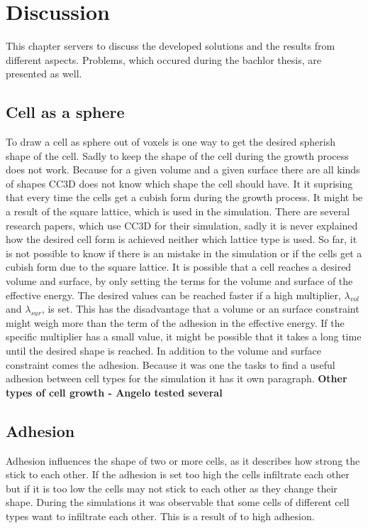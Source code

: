 \chapter{Discussion}
This chapter servers to discuss the developed solutions and the results from different aspects. Problems, which occured during the bachlor thesis, are presented as well.
\section{Cell as a sphere}
To draw a cell as sphere out of voxels is one way to get the desired spherish shape of the cell. Sadly to keep the shape of the cell during the growth process does not work. Because for a given volume and a given surface there are all kinds of shapes \ac{CC3D} does not know which shape the cell should have. It it suprising that every time the cells get a cubish form during the growth process. It might be a result of the square lattice, which is used in the simulation. There are several research papers, which use \ac{CC3D} for their simulation, sadly it is never explained how the desired cell form is achieved neither which lattice type is used. So far, it is not possible to know if there is an mistake in the simulation or if the cells get a cubish form due to the square lattice. \newline
It is possible that a cell reaches a desired volume and surface, by only setting the terms for the volume and surface of the effective energy. The desired values can be reached faster if a high multiplier, $\lambda_{vol}$ and $\lambda_{sur}$, is set. This has the disadvantage that a volume or an surface constraint might weigh more than the term of the adhesion in the effective energy. If the specific multiplier has a small value, it might be possible that it takes a long time until the desired shape is reached. In addition to the volume and surface constraint comes the adhesion. Because it was one the tasks to find a useful adhesion between cell types for the simulation it has it own paragraph.\newline
\textbf{Other types of cell growth - Angelo tested several}
\section{Adhesion}
Adhesion influences the shape of two or more cells, as it describes how strong the stick to each other. If the adhesion is set too high the cells infiltrate each other but if it is too low the cells may not stick to each other as they change their shape. During the simulations it was observable that some cells of different cell types want to infiltrate each other. This is a result of to high adhesion.
